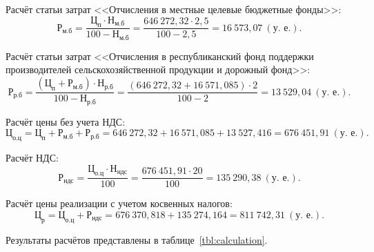 Расчёт статьи затрат
<<Отчисления в местные целевые бюджетные фонды>>:
\begin{equation*}
\text{Р}_{\text{м.б}} =
\dfrac{
  \text{Ц}_{\text{п}} \cdot \text{Н}_{\text{м.б}}
}{
  100 - \text{Н}_{\text{м.б}}
} =
\dfrac{646~272{,}32 \cdot 2{,}5 }{100 - 2{,}5} = 16~573{,}07 ~ (\text{у.~е.}).
\end{equation*}

Расчёт статьи затрат
<<Отчисления в республиканский фонд поддержки производителей
сельскохозяйственной продукции и дорожный фонд>>:
\begin{equation*}
\text{Р}_{\text{р.б}} =
\dfrac{
  (\text{Ц}_{\text{п}} + \text{Р}_{\text{м.б}}) \cdot \text{Н}_{\text{р.б}}
}{
  100 - \text{Н}_{\text{р.б}}
} =
\dfrac{(646~272{,}32 + 16~571{,}085) \cdot 2}{100 - 2} = 13~529{,}04 ~ (\text{у.~е.}).
\end{equation*}

Расчёт цены без учета НДС:
\begin{equation*}
\text{Ц}_{\text{о.ц}} =
\text{Ц}_{\text{п}} + \text{Р}_{\text{м.б}} + \text{Р}_{\text{р.б}} =
646~272{,}32 + 16~571{,}085 + 13~527{,}416 = 676~451{,}91~(\text{у.~е.}).
\end{equation*}

Расчёт НДС:
\begin{equation*}
\text{Р}_{\text{ндс}} =
\dfrac{
  \text{Ц}_{\text{о.ц}} \cdot \text{Н}_{\text{ндс}}
}{
  100
} =
\dfrac{676~451{,}91 \cdot 20}{100} = 135~290{,}38 \: (\text{у.~е.}).
\end{equation*}

Расчёт цены реализации с учетом косвенных налогов:
\begin{equation*}
\text{Ц}_{\text{р}} =
\text{Ц}_{\text{о.ц}} + \text{Р}_{\text{ндс}} =
676~370{,}818 + 135~274{,}164 = 811~742{,}31 ~ (\text{у.~е.}).
\end{equation*}

Результаты расчётов представлены в таблице~\ref{tbl:calculation}.

